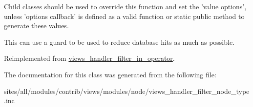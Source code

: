 Child classes should be used to override this function and set the 'value options', unless 'options callback' is defined as a valid function or static public method to generate these values.

This can use a guard to be used to reduce database hits as much as possible. 

Reimplemented from \hyperlink{classviews__handler__filter__in__operator_a5b5df6d90f4359ed28c0c446bdc81a6}{views\_\-handler\_\-filter\_\-in\_\-operator}.

The documentation for this class was generated from the following file:\begin{CompactItemize}
\item 
sites/all/modules/contrib/views/modules/node/views\_\-handler\_\-filter\_\-node\_\-type.inc\end{CompactItemize}
